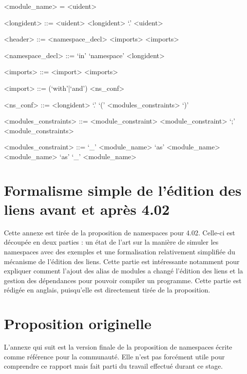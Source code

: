 \documentclass[11pt,a4paper]{report}
\begin{document}
\begin{grammar}
<module_name> = <uident>

<longident> ::= <uident>
\alt <longident> `.' <uident>

<header> ::= <namespace_decl> <imports>
\alt <imports>

<namespace_decl> ::= `in' `namespace' <longident>

<imports> ::= <import> <imports> 

<import> ::= (`with'|`and') <ns_conf> 

<ns_conf> ::= <longident> `.' `(' <modules_constraints> `)'

<modules_constraints> ::= <module_constraint>
\alt <module_constraint> `;' <module_constraints>

<modules_constraint> ::= `_'
\alt <module_name> `as' <module_name>
\alt <module_name> `as' `_'
\alt <module_name>
\end{grammar}

\chapter{Formalisme simple de l'édition des liens avant et après 4.02}
\label{appendix-soa}

Cette annexe est tirée de la proposition de namespaces pour 4.02. Celle-ci est
découpée en deux parties : un état de l'art sur la manière de simuler les
namespaces avec des exemples et une formalisation relativement simplifiée du
mécanisme de l'édition des liens. Cette partie est intéressante notamment pour
expliquer comment l'ajout des alias de modules a changé l'édition des liens et
la gestion des dépendances pour pouvoir compiler un programme. Cette partie est
rédigée en anglais, puisqu'elle est directement tirée de la proposition.




\chapter{Proposition originelle}

L'annexe qui suit est la version finale de la proposition de namespaces écrite
comme référence pour la communauté. Elle n'est pas forcément utile pour
comprendre ce rapport mais fait parti du travail effectué durant ce stage.


\end{document}
